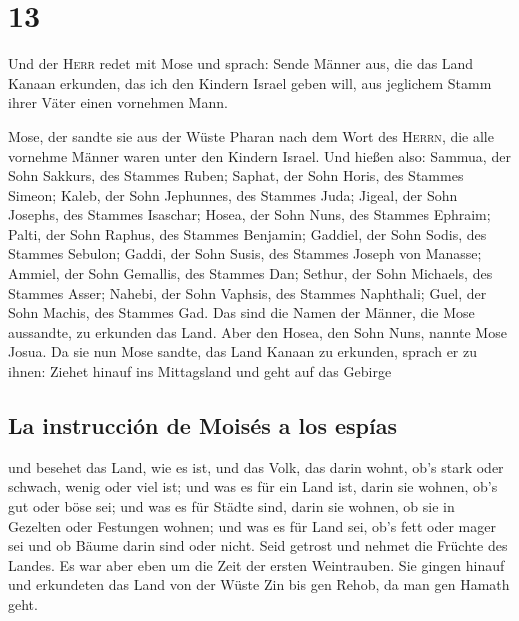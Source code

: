 \hypertarget{section-12}{%
\section{13}\label{section-12}}

 Und der \textsc{Herr} redet mit Mose und sprach:
 Sende Männer aus, die das Land Kanaan erkunden, das ich
den Kindern Israel geben will, aus jeglichem Stamm ihrer Väter einen
vornehmen Mann.

 Mose, der sandte sie aus der Wüste Pharan nach dem Wort
des \textsc{Herrn}, die alle vornehme Männer waren unter den Kindern
Israel.  Und hießen also: Sammua, der Sohn Sakkurs, des
Stammes Ruben;  Saphat, der Sohn Horis, des Stammes
Simeon;  Kaleb, der Sohn Jephunnes, des Stammes Juda;
 Jigeal, der Sohn Josephs, des Stammes Isaschar;
 Hosea, der Sohn Nuns, des Stammes Ephraim; 
Palti, der Sohn Raphus, des Stammes Benjamin;  Gaddiel,
der Sohn Sodis, des Stammes Sebulon;  Gaddi, der Sohn
Susis, des Stammes Joseph von Manasse;  Ammiel, der Sohn
Gemallis, des Stammes Dan;  Sethur, der Sohn Michaels,
des Stammes Asser;  Nahebi, der Sohn Vaphsis, des Stammes
Naphthali;  Guel, der Sohn Machis, des Stammes Gad.
 Das sind die Namen der Männer, die Mose aussandte, zu
erkunden das Land. Aber den Hosea, den Sohn Nuns, nannte Mose Josua.
 Da sie nun Mose sandte, das Land Kanaan zu erkunden,
sprach er zu ihnen: Ziehet hinauf ins Mittagsland und geht auf das
Gebirge

\hypertarget{la-instrucciuxf3n-de-moisuxe9s-a-los-espuxedas}{%
\subsection{La instrucción de Moisés a los
espías}\label{la-instrucciuxf3n-de-moisuxe9s-a-los-espuxedas}}

 und besehet das Land, wie es ist, und das Volk, das
darin wohnt, ob's stark oder schwach, wenig oder viel ist;
 und was es für ein Land ist, darin sie wohnen, ob's gut
oder böse sei; und was es für Städte sind, darin sie wohnen, ob sie in
Gezelten oder Festungen wohnen;  und was es für Land sei,
ob's fett oder mager sei und ob Bäume darin sind oder nicht. Seid
getrost und nehmet die Früchte des Landes. Es war aber eben um die Zeit
der ersten Weintrauben.  Sie gingen hinauf und erkundeten
das Land von der Wüste Zin bis gen Rehob, da man gen Hamath geht.

